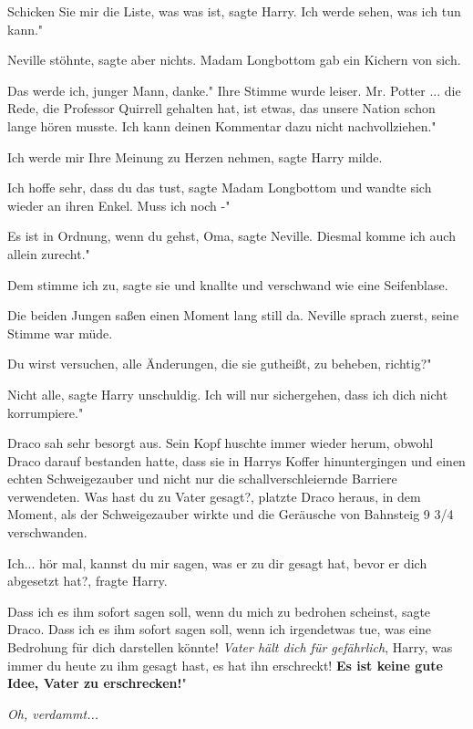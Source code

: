 \glqq Schicken Sie mir die Liste, was was ist\grqq{}, sagte Harry. \glqq Ich
werde sehen, was ich tun kann."

Neville stöhnte, sagte aber nichts. Madam Longbottom gab ein Kichern von sich.

\glqq Das werde ich, junger Mann, danke." Ihre Stimme wurde leiser. \glqq Mr.
Potter ... die Rede, die Professor Quirrell gehalten hat, ist etwas, das unsere
Nation schon lange hören musste. Ich kann deinen Kommentar dazu nicht
nachvollziehen."

\glqq Ich werde mir Ihre Meinung zu Herzen nehmen\grqq{}, sagte Harry milde.

\glqq Ich hoffe sehr, dass du das tust\grqq{}, sagte Madam Longbottom und wandte
sich wieder an ihren Enkel. \glqq Muss ich noch -"

\glqq Es ist in Ordnung, wenn du gehst, Oma\grqq{}, sagte Neville. \glqq Diesmal
komme ich auch allein zurecht."

\glqq Dem stimme ich zu\grqq{}, sagte sie und knallte und verschwand wie eine
Seifenblase.

Die beiden Jungen saßen einen Moment lang still da. Neville sprach zuerst, seine
Stimme war müde.

\glqq Du wirst versuchen, alle Änderungen, die sie gutheißt, zu beheben,
richtig?"

\glqq Nicht alle\grqq{}, sagte Harry unschuldig. \glqq Ich will nur sichergehen,
dass ich dich nicht korrumpiere."

Draco sah sehr besorgt aus. Sein Kopf huschte immer wieder herum, obwohl Draco
darauf bestanden hatte, dass sie in Harrys Koffer hinuntergingen und einen
echten Schweigezauber und nicht nur die schallverschleiernde Barriere
verwendeten. \glqq Was hast du zu Vater gesagt?\grqq{}, platzte Draco heraus, in
dem Moment, als der Schweigezauber wirkte und die Geräusche von Bahnsteig 9 3/4
verschwanden.

\glqq Ich... hör mal, kannst du mir sagen, was er zu dir gesagt hat, bevor er
dich abgesetzt hat?\grqq{}, fragte Harry.

\glqq Dass ich es ihm sofort sagen soll, wenn du mich zu bedrohen
scheinst\grqq{}, sagte Draco. \glqq Dass ich es ihm sofort sagen soll, wenn ich
irgendetwas tue, was eine Bedrohung für dich darstellen könnte! \emph{Vater hält
dich für gefährlich}, Harry, was immer du heute zu ihm gesagt hast, es hat ihn
erschreckt! \textbf{Es ist keine gute Idee, Vater zu erschrecken!}"

\emph{Oh, verdammt...}

